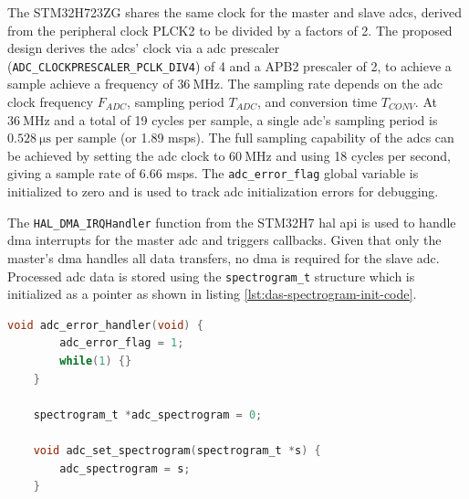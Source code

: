 \documentclass[class=report,11pt,crop=false]{standalone}
\begin{document}
	The STM32H723ZG shares the same clock for the master and slave \acrshort{adc}s, derived from the peripheral clock PLCK2 to be divided by a factors of 2. The proposed design derives the \acrshort{adc}s' clock via a \acrshort{adc} prescaler (\texttt{ADC\_CLOCKPRESCALER\_PCLK\_DIV4}) of 4 and a APB2 prescaler of 2, to achieve a sample achieve a frequency of $\SI{36}{\mega\hertz}$. The sampling rate depends on the \acrshort{adc} clock frequency $F_{ADC}$, sampling period $T_{ADC}$, and conversion time $T_{CONV}$. At $\SI{36}{\mega\hertz}$ and a total of 19 cycles per sample, a single \acrshort{adc}'s sampling period is $\SI{0.528}{\micro\second}$ per sample (or 1.89 \acrshort{msps}). The full sampling capability of the \acrshort{adc}s can be achieved by setting the \acrshort{adc} clock to $\SI{60}{\mega\hertz}$ and using 18 cycles per second, giving a sample rate of 6.66 \acrshort{msps}. The \texttt{adc\_error\_flag} global variable is initialized to zero and is used to track \acrshort{adc} initialization errors for debugging. 
	
	The \texttt{HAL\_DMA\_IRQHandler} function from the STM32H7 \acrshort{hal} \acrshort{api} is used to handle \acrshort{dma} interrupts for the master \acrshort{adc} and triggers callbacks. Given that only the master's \acrshort{dma} handles all data transfers, no \acrshort{dma} is required for the slave \acrshort{adc}. Processed \acrshort{adc} data is stored using the \texttt{spectrogram\_t} structure which is initialized as a pointer as shown in listing \ref{lst:das-spectrogram-init-code}. 
	
	\begin{lstlisting}[language=C, label={lst:das-spectrogram-init-code}, caption={The \texttt{HAL\_DMA\_IRQHandler} function is used to handle \acrshort{dma} transfers while the \texttt{adc\_set\_spectrogram(spectrogram\_t *s)} function is used to initialize a pointer to a \texttt{spectrogram} structure.}]
	void adc_error_handler(void) {
		adc_error_flag = 1;
		while(1) {}
	}
	
	spectrogram_t *adc_spectrogram = 0;
	
	void adc_set_spectrogram(spectrogram_t *s) {
		adc_spectrogram = s;
	}
	\end{lstlisting}
	
\end{document}
